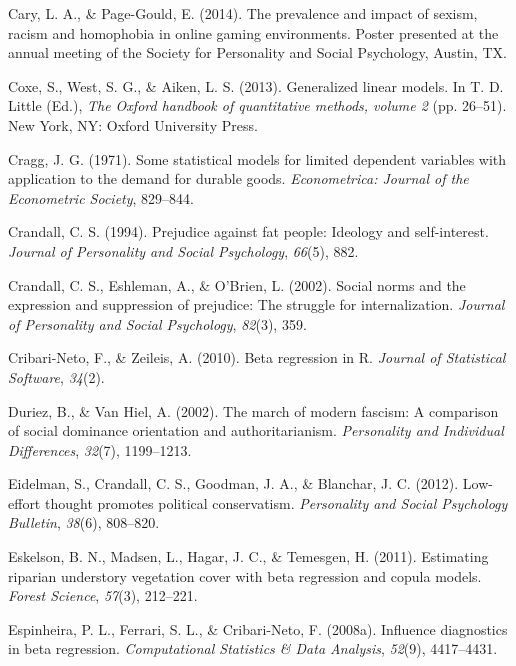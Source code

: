 \documentclass[english,man]{apa6}
\newcounter{author}
\theoremstyle{definition}
\theoremstyle{definition}
\theoremstyle{remark}
\begin{document}
\hypertarget{ref-cary2014prevalence}{}
Cary, L. A., \& Page-Gould, E. (2014). The prevalence and impact of
sexism, racism and homophobia in online gaming environments. Poster
presented at the annual meeting of the Society for Personality and
Social Psychology, Austin, TX.

\hypertarget{ref-coxe2013generalized}{}
Coxe, S., West, S. G., \& Aiken, L. S. (2013). Generalized linear
models. In T. D. Little (Ed.), \emph{The Oxford handbook of quantitative
methods, volume 2} (pp. 26--51). New York, NY: Oxford University Press.

\hypertarget{ref-cragg1971some}{}
Cragg, J. G. (1971). Some statistical models for limited dependent
variables with application to the demand for durable goods.
\emph{Econometrica: Journal of the Econometric Society}, 829--844.

\hypertarget{ref-crandall1994prejudice}{}
Crandall, C. S. (1994). Prejudice against fat people: Ideology and
self-interest. \emph{Journal of Personality and Social Psychology},
\emph{66}(5), 882.

\hypertarget{ref-crandall2002social}{}
Crandall, C. S., Eshleman, A., \& O'Brien, L. (2002). Social norms and
the expression and suppression of prejudice: The struggle for
internalization. \emph{Journal of Personality and Social Psychology},
\emph{82}(3), 359.

\hypertarget{ref-cribarineto2010beta}{}
Cribari-Neto, F., \& Zeileis, A. (2010). Beta regression in R.
\emph{Journal of Statistical Software}, \emph{34}(2).

\hypertarget{ref-duriez2002march}{}
Duriez, B., \& Van Hiel, A. (2002). The march of modern fascism: A
comparison of social dominance orientation and authoritarianism.
\emph{Personality and Individual Differences}, \emph{32}(7), 1199--1213.

\hypertarget{ref-eidelman2012low}{}
Eidelman, S., Crandall, C. S., Goodman, J. A., \& Blanchar, J. C.
(2012). Low-effort thought promotes political conservatism.
\emph{Personality and Social Psychology Bulletin}, \emph{38}(6),
808--820.

\hypertarget{ref-eskelson2011estimating}{}
Eskelson, B. N., Madsen, L., Hagar, J. C., \& Temesgen, H. (2011).
Estimating riparian understory vegetation cover with beta regression and
copula models. \emph{Forest Science}, \emph{57}(3), 212--221.

\hypertarget{ref-espinheira2008influence}{}
Espinheira, P. L., Ferrari, S. L., \& Cribari-Neto, F. (2008a).
Influence diagnostics in beta regression. \emph{Computational Statistics
\& Data Analysis}, \emph{52}(9), 4417--4431.
\end{document}
